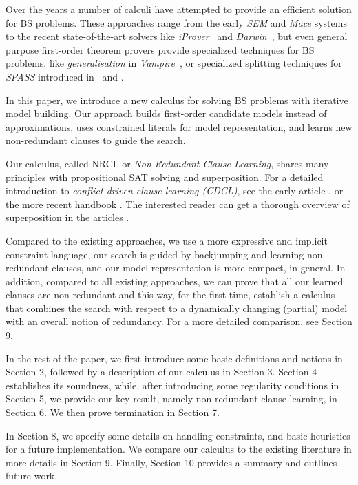 \documentclass[a4paper]{article}
\newcommand{\mEPRs}{BS}
\begin{document}
Over the years a number of calculi have attempted to provide an efficient 
solution for {\mEPRs} problems. 
These approaches range from the early \emph{SEM} and \emph{Mace} systems~\cite{Tammet03finitemodel} to the recent state-of-the-art solvers 
like \emph{iProver}~\cite{InstGen03} and \emph{Darwin}~\cite{ModelEvolution03}, but even general purpose first-order theorem provers 
provide specialized techniques for {\mEPRs} problems, 
like \emph{generalisation} in \emph{Vampire}~\cite{Generalization08}, or 
specialized splitting techniques for \emph{SPASS} introduced in~\cite{HillenbrandWeidenbach13} and \cite{FietzkeW09}. 

In this paper, we introduce a new calculus for solving {\mEPRs} problems with 
iterative model building.
Our approach builds first-order candidate models instead of approximations, uses 
constrained literals for model representation, and learns new non-redundant clauses to guide the search.

Our calculus, called NRCL or \emph{Non-Redundant Clause Learning}, 
shares many principles with propositional SAT solving and superposition.
For a detailed introduction to \emph{conflict-driven clause learning (CDCL)}, 
see the early article \cite{SilvaS96}, or the more recent handbook \cite{SATHandbook}.
The interested reader can get a thorough overview of superposition in the articles 
\cite{BachmairGLS92}\cite{BachmairGLS95}\cite{Weidenbach01}\cite{BachmairG01}\cite{NieuwenhuisR01}.

Compared to the existing approaches, we use a more expressive and implicit constraint language,
our search is guided by backjumping and learning non-redundant clauses, and 
our model representation is more compact, in general.
In addition, compared to all existing approaches, we can prove that all our learned clauses are non-redundant
and this way, for the first time, establish a calculus that combines the search with respect to a dynamically
changing (partial) model with an overall notion of redundancy. 
For a more detailed comparison, see Section 9.

In the rest of the paper, we first introduce some basic definitions and notions in Section 2, followed by 
a description of our calculus in Section 3.
Section 4 establishes its soundness, while, after introducing some regularity conditions in Section 5, we 
provide our key result, namely non-redundant clause learning, in Section 6. 
We then prove termination in Section 7.

In Section 8, we specify some details on handling constraints, and basic heuristics for a future implementation.
We compare our calculus to the existing literature in more details in Section 9.
Finally, Section 10 provides a summary and outlines future work.
\end{document}
